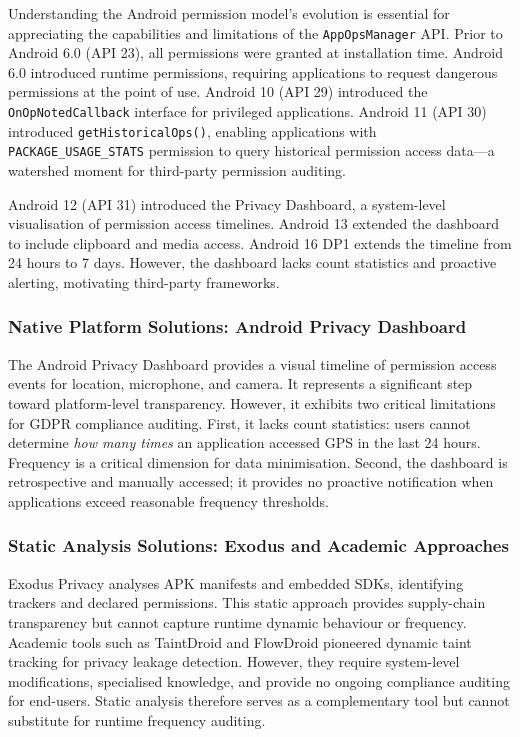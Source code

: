 Understanding the Android permission model's evolution is essential for appreciating the capabilities and limitations of the \texttt{AppOpsManager} API. Prior to Android 6.0 (API 23), all permissions were granted at installation time. Android 6.0 introduced runtime permissions, requiring applications to request dangerous permissions at the point of use. Android 10 (API 29) introduced the \texttt{OnOpNotedCallback} interface for privileged applications. Android 11 (API 30) introduced \texttt{getHistoricalOps()}, enabling applications with \texttt{PACKAGE\_USAGE\_STATS} permission to query historical permission access data—a watershed moment for third-party permission auditing.

Android 12 (API 31) introduced the Privacy Dashboard, a system-level visualisation of permission access timelines. Android 13 extended the dashboard to include clipboard and media access. Android 16 DP1 extends the timeline from 24 hours to 7 days. However, the dashboard lacks count statistics and proactive alerting, motivating third-party frameworks.

\subsubsection{Native Platform Solutions: Android Privacy Dashboard}

The Android Privacy Dashboard provides a visual timeline of permission access events for location, microphone, and camera. It represents a significant step toward platform-level transparency. However, it exhibits two critical limitations for GDPR compliance auditing. First, it lacks count statistics: users cannot determine \emph{how many times} an application accessed GPS in the last 24 hours. Frequency is a critical dimension for data minimisation. Second, the dashboard is retrospective and manually accessed; it provides no proactive notification when applications exceed reasonable frequency thresholds.

\subsubsection{Static Analysis Solutions: Exodus and Academic Approaches}

Exodus Privacy analyses APK manifests and embedded SDKs, identifying trackers and declared permissions. This static approach provides supply-chain transparency but cannot capture runtime dynamic behaviour or frequency. Academic tools such as TaintDroid \cite{49} and FlowDroid pioneered dynamic taint tracking for privacy leakage detection. However, they require system-level modifications, specialised knowledge, and provide no ongoing compliance auditing for end-users. Static analysis therefore serves as a complementary tool but cannot substitute for runtime frequency auditing.

